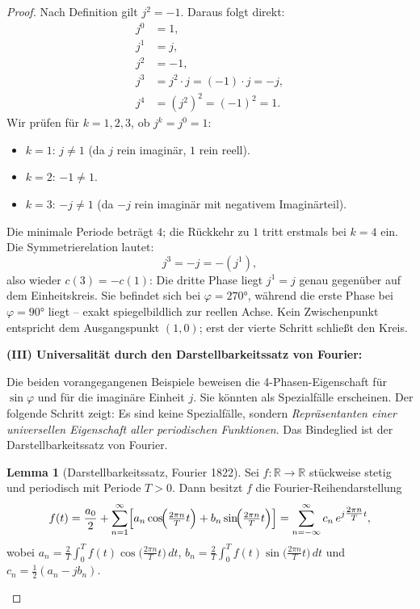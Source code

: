 ﻿\documentclass[a4paper,12pt]{article}
\theoremstyle{definition}
\newtheorem{lemma}[theorem]{Lemma}
\begin{document}
\begin{proof}
Nach Definition gilt $j^2 = -1$. Daraus folgt direkt:
\begin{align*}
	j^0 &= 1, \\
	j^1 &= j, \\
	j^2 &= -1, \\
	j^3 &= j^2 \cdot j = (-1)\cdot j = -j, \\
	j^4 &= (j^2)^2 = (-1)^2 = 1.
\end{align*}
Wir prüfen für $k = 1, 2, 3$, ob $j^k = j^0 = 1$:
\begin{itemize}
	\item $k=1$: $j \neq 1$ (da $j$ rein imaginär, $1$ rein reell).
	\item $k=2$: $-1 \neq 1$.
	\item $k=3$: $-j \neq 1$ (da $-j$ rein imaginär mit negativem Imaginärteil).
\end{itemize}
Die minimale Periode beträgt $4$; die Rückkehr zu $1$ tritt erstmals bei $k=4$ ein.
Die Symmetrierelation lautet:
\[
	j^3 = -j = -(j^1),
\]
also wieder $c(3) = -c(1)$: Die dritte Phase liegt $j^1 = j$ genau gegenüber
auf dem Einheitskreis. Sie befindet sich bei $\varphi = 270 °$, während die erste
Phase bei $\varphi = 90 °$ liegt -- exakt spiegelbildlich zur reellen Achse.
Kein Zwischenpunkt entspricht dem Ausgangspunkt $(1,0)$; erst der vierte Schritt
schließt den Kreis.

\medskip
\textbf{(III) Universalität durch den Darstellbarkeitssatz von Fourier:}

Die beiden vorangegangenen Beispiele beweisen die 4-Phasen-Eigenschaft für
$\sin\varphi$ und für die imaginäre Einheit $j$. Sie könnten als Spezialfälle
erscheinen. Der folgende Schritt zeigt: Es sind keine Spezialfälle, sondern
\textit{Repräsentanten einer universellen Eigenschaft aller periodischen Funktionen}.
Das Bindeglied ist der Darstellbarkeitssatz von Fourier.

\begin{lemma}[Darstellbarkeitssatz, Fourier 1822]
	Sei $f\colon\mathbb{R}\to\mathbb{R}$ stückweise stetig und periodisch mit
	Periode $T > 0$. Dann besitzt $f$ die Fourier-Reihendarstellung
	\begin{equation}
		f(t)
		= \frac{a_0}{2}
		+ \sum_{n=1}^{\infty}
		\Bigl[
		a_n\cos\!\Bigl(\tfrac{2\pi n}{T}t\Bigr)
		+ b_n\sin\!\Bigl(\tfrac{2\pi n}{T}t\Bigr)
		\Bigr]
		= \sum_{n=-\infty}^{\infty} c_n\,e^{j\tfrac{2\pi n}{T}t},
	\end{equation}
	wobei $a_n = \tfrac{2}{T}\!\int_0^T f(t)\cos\!\bigl(\tfrac{2\pi n}{T}t\bigr)\,dt$,
	$b_n = \tfrac{2}{T}\!\int_0^T f(t)\sin\!\bigl(\tfrac{2\pi n}{T}t\bigr)\,dt$
	und $c_n = \tfrac{1}{2}(a_n - jb_n)$.
\end{lemma}


\end{proof}
\end{document}
